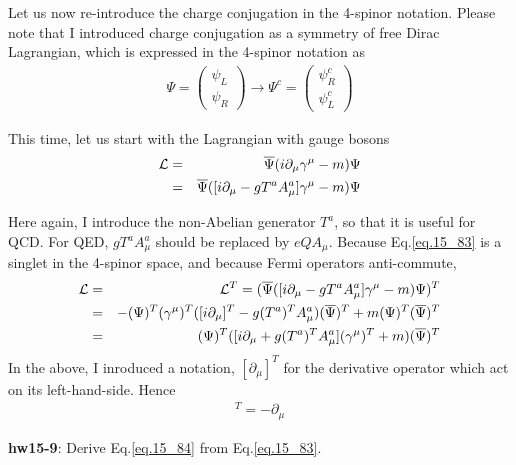 \documentclass[12pt]{article}
\def\del{{\partial}}
\begin{document}
{  Let us now re-introduce the charge conjugation in the 4-spinor notation.
  Please note that I introduced charge conjugation as a symmetry of
  free Dirac Lagrangian, which is expressed in the 4-spinor notation as
\begin{eqnarray}
  \Psi =
  \begin{pmatrix}
    \psi_L \\ \psi_R
  \end{pmatrix}
  \to \Psi^c = 
  \begin{pmatrix}
    \psi_R^c \\ \psi_L^c
  \end{pmatrix} \label{eq.15_82}
\end{eqnarray}
 
  This time, let us start with the Lagrangian with gauge bosons
\begin{eqnarray}
  {\cal L} &=& {\overline \Psi} (i\del_\mu \gamma^\mu - m) \Psi \\
        &=& {\overline \Psi} ([i\del_\mu - g T^a A^a_\mu] \gamma^\mu - m) \Psi \label{eq.15_83}
\end{eqnarray}

  Here again, I introduce the non-Abelian generator $T^a$, so that it is
  useful for QCD. For QED, $gT^a A^a_\mu$ should be replaced by $eQ A_\mu$.
  Because Eq.\ref{eq.15_83} is a singlet in the 4-spinor space, and because Fermi operators anti-commute,
\begin{eqnarray}
  {\cal L}&=&  {\cal L}^T
  =  ({\overline \Psi} ([i\del_\mu - g T^a A^a_\mu] \gamma^\mu - m) \Psi)^T \\
  &=& -(\Psi)^T (\gamma^\mu)^T ([i\del_\mu]^T -g(T^a)^T A^a_\mu) ({\overline \Psi})^T
    +m (\Psi)^T  ({\overline \Psi})^T \\
  &=& (\Psi)^T ([i\del_\mu +g(T^a)^TA^a_\mu](\gamma^\mu)^T +m) ({\overline \Psi})^T \label{eq.15_84}
\end{eqnarray}
  In the above, I inroduced a notation, $[\del_\mu]^T$ for the derivative
  operator which act on its left-hand-side. Hence
\begin{eqnarray}
  [\del_\mu]^T = -\del_\mu \label{eq.15_85}
\end{eqnarray}

{\bf hw15-9}: Derive Eq.\ref{eq.15_84} from Eq.\ref{eq.15_83}.

}
\end{document}
